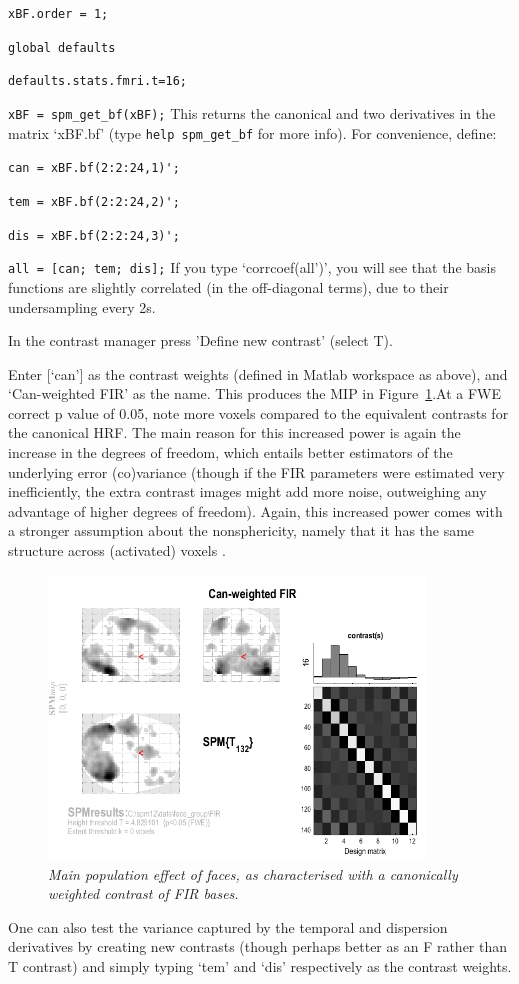 \item{\verb!xBF.order = 1;!}
\item{\verb!global defaults!}
\item{\verb!defaults.stats.fmri.t=16;!}
\item{\verb!xBF = spm_get_bf(xBF);!}
\ei
This returns the canonical and two derivatives in the matrix `xBF.bf' (type \verb!help spm_get_bf! for more info). For convenience, define:
\bi
\item{\verb!can = xBF.bf(2:2:24,1)';!}
\item{\verb!tem = xBF.bf(2:2:24,2)';!}
\item{\verb!dis = xBF.bf(2:2:24,3)';!}
\item{\verb!all = [can; tem; dis];!}
\ei
If you type `corrcoef(all')', you will see that the basis functions are slightly correlated (in the off-diagonal terms), due to their undersampling every 2s.
\bi
\item{In the contrast manager press 'Define new contrast' (select T).}
\item{Enter [`can'] as the contrast weights (defined in Matlab workspace as above), and `Can-weighted FIR' as the name.}
\ei
This produces the MIP in Figure~\ref{can_weighted_fir}.At a FWE correct p value of 0.05, note more voxels compared to the equivalent contrasts for the canonical HRF. The main reason for this increased power is again the increase in the degrees of freedom, which entails better estimators of the underlying error (co)variance (though if the FIR parameters were estimated very inefficiently, the extra contrast images might add more noise, outweighing any advantage of higher degrees of freedom). Again, this increased power comes with a stronger assumption about the nonsphericity, namely that it has the same structure across (activated) voxels \cite{daniel_hbf2}.
\begin{figure}
\begin{center}
\includegraphics[width=100mm]{faces_group/can_weighted_fir}
\caption{\em Main population effect of faces, as characterised with a canonically weighted contrast of FIR bases. \label{can_weighted_fir}}
\end{center}
\end{figure}
One can also test the variance captured by the temporal and dispersion derivatives by creating new contrasts (though perhaps better as an F rather than T contrast) and simply typing `tem' and `dis' respectively as the contrast weights.

